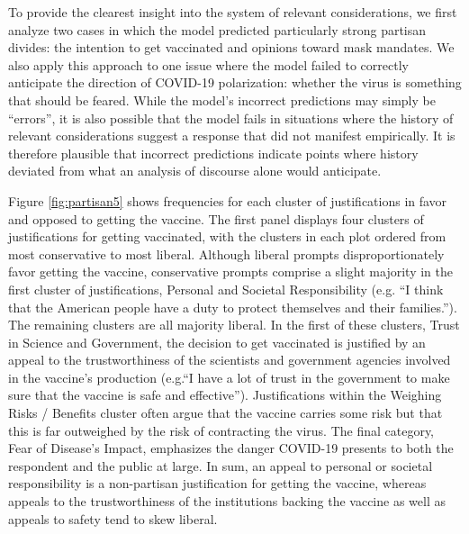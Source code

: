 \documentclass{article}
\begin{document}
To provide the clearest insight into the system of relevant
considerations, we first analyze two cases in which the model predicted
particularly strong partisan divides: the intention to get vaccinated
and opinions toward mask mandates. We also apply this approach to one
issue where the model failed to correctly anticipate the direction of
COVID-19 polarization: whether the virus is something that should be
feared. While the model's incorrect predictions may simply be
``errors'', it is also possible that the model fails in situations where
the history of relevant considerations suggest a response that did not
manifest empirically. It is therefore plausible that incorrect
predictions indicate points where history deviated from what an analysis
of discourse alone would anticipate.

Figure \ref{fig:partisan5} shows frequencies for each cluster of justifications in favor
and opposed to getting the vaccine. The first panel displays four
clusters of justifications for getting vaccinated, with the clusters in
each plot ordered from most conservative to most liberal. Although
liberal prompts disproportionately favor getting the vaccine,
conservative prompts comprise a slight majority in the first cluster of
justifications, Personal and Societal Responsibility (e.g. ``I think
that the American people have a duty to protect themselves and their
families.''). The remaining clusters are all majority liberal. In the
first of these clusters, Trust in Science and Government, the decision
to get vaccinated is justified by an appeal to the trustworthiness of
the scientists and government agencies involved in the vaccine's
production (e.g.``I have a lot of trust in the government to make sure
that the vaccine is safe and effective''). Justifications within the
Weighing Risks / Benefits cluster often argue that the vaccine carries
some risk but that this is far outweighed by the risk of contracting the
virus. The final category, Fear of Disease's Impact, emphasizes the
danger COVID-19 presents to both the respondent and the public at large.
In sum, an appeal to personal or societal responsibility is a
non-partisan justification for getting the vaccine, whereas appeals to
the trustworthiness of the institutions backing the vaccine as well as
appeals to safety tend to skew liberal.
\end{document}
